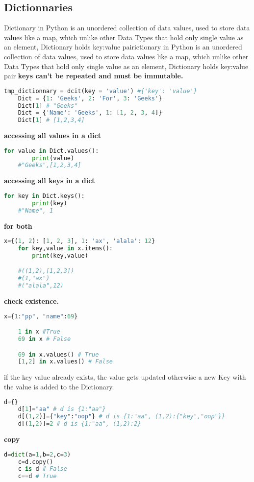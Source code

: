\documentclass[10pt]{article}
\begin{document}
\subsection{Dictionnaries}
Dictionary in Python is an unordered collection of data values, used to store data values like a map, which unlike other Data Types that hold only single value as an element, Dictionary holds key:value pairictionary in Python is an unordered collection of data values, used to store data values like a map, which unlike other Data Types that hold only single value as an element, Dictionary holds key:value pair
\textbf{keys can’t be repeated and must be immutable.}
\begin{lstlisting}[language=Python]
	tmp_dictionnary = dcit(key = 'value') #{'key': 'value'}
	Dict = {1: 'Geeks', 2: 'For', 3: 'Geeks'}
	Dict[1] # "Geeks"
	Dict = {'Name': 'Geeks', 1: [1, 2, 3, 4]}
	Dict[1] # [1,2,3,4]
\end{lstlisting}
\textbf{accessing all values in a dict} 
\begin{lstlisting}[language=Python]
	for value in Dict.values():
		print(value)
	#"Geeks",[1,2,3,4]
\end{lstlisting}
\textbf{accessing all keys in a dict} 
\begin{lstlisting}[language=Python]
	for key in Dict.keys():
		print(key)
	#"Name", 1
\end{lstlisting}
\textbf{for both}
\begin{lstlisting}[language=Python]
	x={(1, 2): [1, 2, 3], 1: 'ax', 'alala': 12}
	for key,value in x.items():
		print(key,value)

	#((1,2),[1,2,3])
	#(1,"ax")
	#("alala",12)
\end{lstlisting}
\textbf{check existence.}
\begin{lstlisting}[language=Python]
	x={1:"pp", "name":69}

	1 in x #True
	69 in x # False

	69 in x.values() # True
	[1,2] in x.values() # False
\end{lstlisting}
if the key value already exists, the value gets updated otherwise a new Key with the value is added to the Dictionary.
\begin{lstlisting}[language=Python]
	d={}
	d[1]="aa" # d is {1:"aa"}
	d[(1,2)]={"key":"oop"} # d is {1:"aa", (1,2):{"key","oop"}}
	d[(1,2)]=2 # d is {1:"aa", (1,2):2}
\end{lstlisting}
\textbf{copy}
\begin{lstlisting}[language=Python]
	d=dict(a=1,b=2,c=3)
	c=d.copy()
	c is d # False
	c==d # True
\end{lstlisting}
\end{document}

